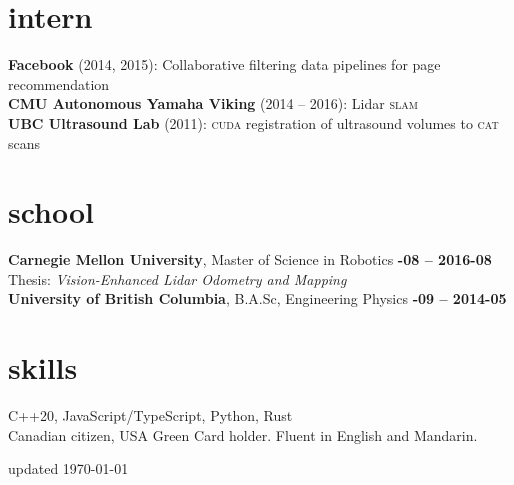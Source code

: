\documentclass[margin,10pt]{res}
\begin{document}
\begin{resume}
\section{\sc \lsstyle intern}
    \textbf{Facebook} (2014, 2015): Collaborative filtering data pipelines for page recommendation\\
    \textbf{CMU Autonomous Yamaha Viking} (2014 -- 2016): Lidar \textsc{slam} \\
    \textbf{UBC Ultrasound Lab} (2011): \textsc{cuda} registration of ultrasound volumes to \textsc{cat} scans
\section{\sc \lsstyle school}
    \textbf{Carnegie Mellon University}, Master of Science in Robotics \hfill \textsc{\bfseries{}-08 -- 2016-08}\\
    Thesis: \textit{Vision-Enhanced Lidar Odometry and Mapping}\vspace{3pt}\\
    \textbf{University of British Columbia}, B.A.Sc, Engineering Physics \hfill \textsc{\bfseries{}-09 -- 2014-05}\\
\section{\sc \lsstyle skills}
    C++20, JavaScript/TypeScript, Python, Rust \\
    Canadian citizen, USA Green Card holder. Fluent in English and Mandarin.\\
\end{resume}
\begin{minipage}[t]{\textwidth}
    \flushright
    \small
    \sc \lsstyle
    \hfill updated \today
\end{minipage}
\end{document}
